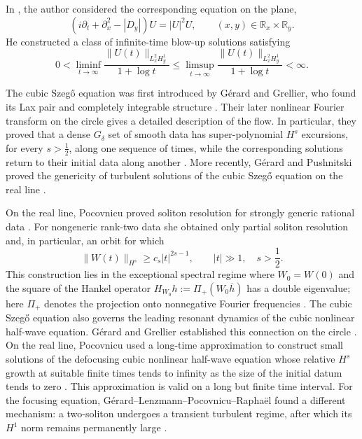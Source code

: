 \documentclass[11pt,reqno]{amsart}
\numberwithin{equation}{section}
\theoremstyle{remark}
\newcommand{\half}{\frac12}
\begin{document}
In \cite{ChenPlane}, the author considered the corresponding equation on the plane,
\[
 (i\partial_t+\partial_x^2-|D_y|)U=|U|^2U,
 \qquad (x,y)\in\mathbb R_x\times\mathbb R_y.
\]
He constructed a class of infinite-time blow-up solutions satisfying
\[
 0<\liminf_{t\to\infty}
 \frac{\|U(t)\|_{L_x^2H_y^1}}{1+\log t}
 \leq\limsup_{t\to\infty}
 \frac{\|U(t)\|_{L_x^2H_y^1}}{1+\log t}<\infty.
\]

The cubic Szeg\H{o} equation was first introduced by G\'erard and Grellier, who found
its Lax pair and completely integrable structure
\cite{GerardGrellierSzego}.  Their later nonlinear Fourier transform on the
circle gives a detailed description of the flow.  In particular, they proved
that a dense $G_\delta$ set of smooth data has super-polynomial $H^s$
excursions, for every $s>\half$, along one sequence of times, while the
corresponding solutions return to their initial data along another
\cite{GerardGrellierHankel}. More recently, Gérard and Pushnitski proved the genericity of turbulent solutions of the
cubic Szeg\H o equation on the real line \cite{GerardPushnitskiInverse}.

On the real line, Pocovnicu proved soliton resolution for strongly generic
rational data \cite[Theorem~1.10]{PocovnicuExplicit}.  For nongeneric
rank-two data she obtained only partial soliton resolution and, in particular,
an orbit for which
\[
 \|W(t)\|_{H^s}\geq c_s|t|^{2s-1},
 \qquad |t|\gg1,\quad s>\half.
\]
This construction lies in the exceptional spectral regime where
$W_0=W(0)$ and the square of the Hankel operator
$H_{W_0}h:=\Pi_+(W_0\overline h)$ has a double eigenvalue; here $\Pi_+$ denotes
the projection onto nonnegative Fourier frequencies
\cite[Proposition~1.6, Theorem~1.11, and
Corollary~1.12]{PocovnicuExplicit}.  The cubic Szeg\H{o}
equation also governs the leading resonant dynamics of the cubic nonlinear half-wave
equation.  G\'erard and Grellier established this connection on the circle
\cite{GerardGrellierEffective}.  On the real line, Pocovnicu used a long-time
approximation to construct small solutions of the defocusing cubic nonlinear half-wave
equation whose relative $H^s$ growth at suitable finite times tends to
infinity as the size of the initial datum tends to zero
\cite[Theorem~1.2 and Corollary~1.4]{PocovnicuApprox}.  This approximation is
valid on a long but finite time
interval.  For the focusing equation,
G\'erard--Lenzmann--Pocovnicu--Rapha\"el
found a different mechanism: a two-soliton undergoes a transient turbulent
regime, after which its $H^1$ norm remains permanently large
\cite[Theorem~1.2]{GLPR}.
\end{document}
